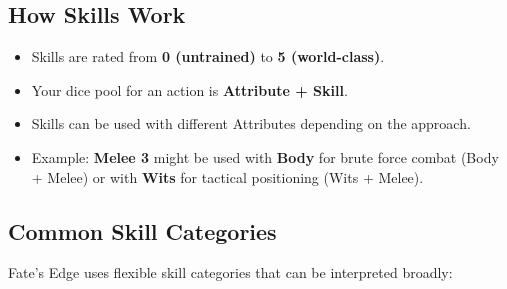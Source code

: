 \subsection*{How Skills Work}

\begin{itemize}
  \item Skills are rated from \textbf{0 (untrained)} to \textbf{5 (world-class)}.
  \item Your dice pool for an action is \textbf{Attribute + Skill}.
  \item Skills can be used with different Attributes depending on the approach.
  \item Example: \textbf{Melee 3} might be used with \textbf{Body} for brute force combat (Body + Melee) or with \textbf{Wits} for tactical positioning (Wits + Melee).
\end{itemize}

\subsection*{Common Skill Categories}

Fate's Edge uses flexible skill categories that can be interpreted broadly:

